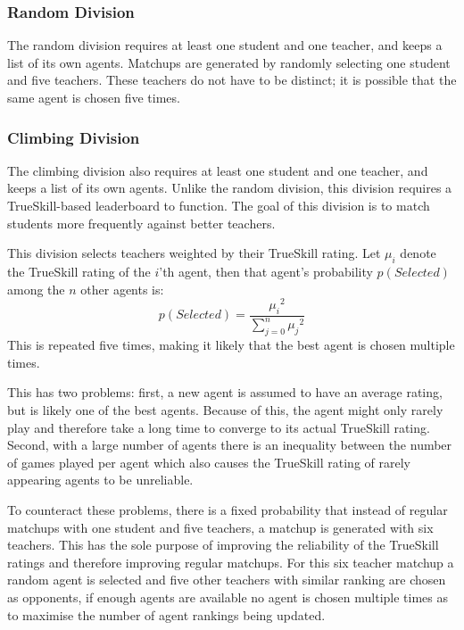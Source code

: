 \subsubsection{Random Division}
The random division requires at least one student and one teacher, and keeps a list of its own agents. Matchups are generated by randomly selecting one student and five teachers. These teachers do not have to be distinct; it is possible that the same agent is chosen five times.

\subsubsection{Climbing Division}
The climbing division also requires at least one student and one teacher, and keeps a list of its own agents. Unlike the random division, this division requires a TrueSkill-based leaderboard to function. The goal of this division is to match students more frequently against better teachers.

This division selects teachers weighted by their TrueSkill rating. Let $\mu_i$ denote the TrueSkill rating of the $i$'th agent, then that agent's probability $p(Selected)$ among the $n$ other agents is:
\begin{equation}
  p(Selected) = \frac{{\mu_i}^2}{\sum_{j=0}^{n} {\mu_j}^2}
\end{equation}
This is repeated five times, making it likely that the best agent is chosen multiple times.

This has two problems: first, a new agent is assumed to have an average rating, but is likely one of the best agents. Because of this, the agent might only rarely play and therefore take a long time to converge to its actual TrueSkill rating. Second, with a large number of agents there is an inequality between the number of games played per agent which also causes the TrueSkill rating of rarely appearing agents to be unreliable.

To counteract these problems, there is a fixed probability that instead of regular matchups with one student and five teachers, a matchup is generated with six teachers. This has the sole purpose of improving the reliability of the TrueSkill ratings and therefore improving regular matchups. For this six teacher matchup a random agent is selected and five other teachers with similar ranking are chosen as opponents, if enough agents are available no agent is chosen multiple times as to maximise the number of agent rankings being updated.

